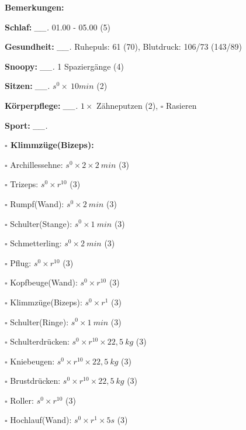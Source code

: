 \documentclass[10pt,a4paper]{article}
\newcommand\prop[1] {{\color {alizarin} {\bf #1}}}             %
\newcommand\mand[1] {{\color {burntorange} {\bf #1}}}          %
\newcommand\topspace{\vskip -15pt \hskip 20pt}
\newcommand\n[1] { {\sl #1.} \hskip 5pt }
\begin{document}
\begin{mdframed}[style=daystyle]
  \begin{labeling}{{\mand {Bemerkungen:}}}
    \setlength\itemsep{-3pt}
  \item[{\mand {Schlaf:}}]        \n{\_\_} 01.00 - 05.00 (5)
  \item[{\mand {Gesundheit:}}]    \n{\_\_} Ruhepuls: 61 (70), Blutdruck: 106/73 (143/89)
  \item[{\mand {Snoopy:}}]        \n{\_\_} 1 Spaziergänge (4)   
  \item[{\mand {Sitzen:}}]        \n{\_\_} $s^0 \times\ 10 min$ (2)
  \item[{\mand {Körperpflege:}}]  \n{\_\_} $1 \times$ Zähneputzen (2), $\square$ Rasieren
  \item[{\mand {Sport:}}]         \n{\_\_}
    \topspace
    \begin{minipage}{0.75\textwidth}  
      \begin{labeling}{\prop {$\square$ {Klimmzüge(Bizeps):}}}
        \setlength\itemsep{-3pt}
      \item[$\square$ Archillessehne:]    $s^0 \times 2 \times 2\ min$ (3)
      \item[$\square$ Trizeps:]           $s^0 \times r^{10}$ (3)
      \item[$\square$ Rumpf(Wand):]       $s^0 \times 2\ min$ (3)
      \item[$\square$ Schulter(Stange):]  $s^0 \times 1\ min$ (3)
      \item[$\square$ Schmetterling:]     $s^0 \times 2\ min$ (3)
      \item[$\square$ Pflug:]             $s^0 \times r^{10}$ (3)
      \item[$\square$ Kopfbeuge(Wand):]   $s^0 \times r^{10}$ (3)
      \item[$\square$ Klimmzüge(Bizeps):] $s^0 \times r^1$ (3)
      \item[$\square$ Schulter(Ringe):]   $s^0 \times 1\ min$ (3)
      \item[$\square$ Schulterdrücken:]   $s^0 \times r^{10} \times 22,5\ kg$ (3)
      \item[$\square$ Kniebeugen:]        $s^0 \times r^{10} \times 22,5\ kg$ (3)
      \item[$\square$ Brustdrücken:]      $s^0 \times r^{10} \times 22,5\ kg$ (3)
      \item[$\square$ Roller:]            $s^0 \times r^{10}$ (3)
      \item[$\square$ Hochlauf(Wand):]    $s^0 \times r^{1} \times 5s$ (3)

\end{labeling}
\end{minipage}
\end{labeling}
\end{mdframed}
\end{document}

